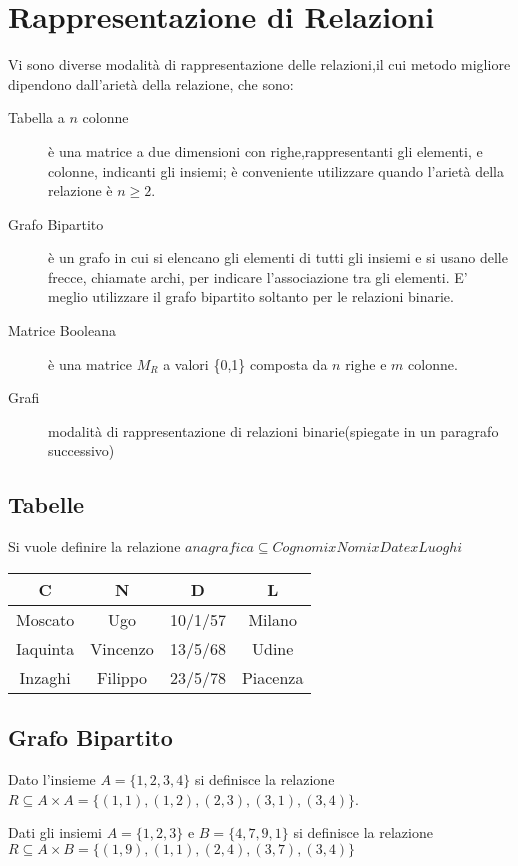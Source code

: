 \section{Rappresentazione di Relazioni}
Vi sono diverse modalità di rappresentazione delle relazioni,il cui metodo migliore
dipendono dall'arietà della relazione, che sono:
\begin{description}
    \item[Tabella a $n$ colonne] è una matrice a due dimensioni con righe,rappresentanti
          gli elementi, e colonne, indicanti gli insiemi; è conveniente utilizzare
          quando l'arietà della relazione è $n \geq 2$.
    \item[Grafo Bipartito] è un grafo in cui si elencano gli elementi di tutti gli insiemi
         e si usano delle frecce, chiamate archi, per indicare l'associazione tra gli elementi.
         E' meglio utilizzare il grafo bipartito soltanto per le relazioni binarie.
    \item[Matrice Booleana] è una matrice $M_R$ a valori \{0,1\} composta da $n$ righe e $m$ colonne.
    \item[Grafi] modalità di rappresentazione di relazioni binarie(spiegate in un paragrafo successivo)
\end{description}

\subsection{Tabelle}
Si vuole definire la relazione $anagrafica \subseteq Cognomi x Nomi x Date x Luoghi$

\begin{tabular}{cccc}
\toprule
C & N & D & L \\
\midrule
Moscato & Ugo & 10/1/57 & Milano \\
Iaquinta & Vincenzo & 13/5/68 & Udine \\
Inzaghi & Filippo & 23/5/78 & Piacenza \\
\bottomrule
\end{tabular}

\subsection{Grafo Bipartito}
Dato l'insieme $A = \{ 1,2,3,4 \}$ si definisce la relazione
$R \subseteq A \times A = \{ (1,1),(1,2),(2,3),(3,1),(3,4) \}$.

Dati gli insiemi $A = \{1,2,3\}$ e $B= \{4,7,9,1\}$ si definisce la relazione
$R \subseteq A \times B = \{(1,9),(1,1),(2,4),(3,7),(3,4)\}$

